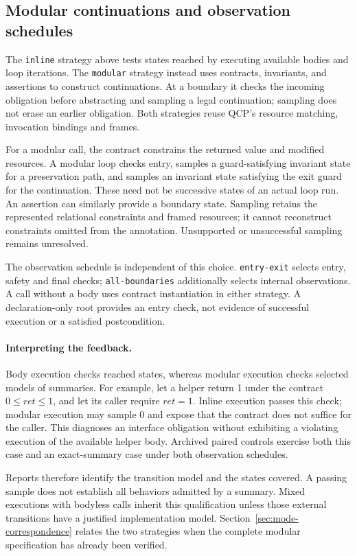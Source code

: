 \subsection{Modular continuations and observation schedules}
\label{sec:strategies}
The \texttt{inline} strategy above tests states reached by executing
available bodies and loop iterations. The \texttt{modular} strategy instead
uses contracts, invariants, and assertions to construct continuations.
At a boundary it checks the incoming obligation before abstracting and
sampling a legal continuation; sampling does not erase an earlier obligation.
Both strategies reuse QCP's resource matching, invocation bindings and frames.

For a modular call, the contract constrains the returned value and modified
resources. A modular loop checks entry, samples a guard-satisfying invariant
state for a preservation path, and samples an invariant state satisfying the
exit guard for the continuation. These need not be successive states of an
actual loop run. An assertion can similarly provide a boundary state.
Sampling retains the represented relational constraints and framed resources;
it cannot reconstruct constraints omitted from the annotation.
Unsupported or unsuccessful sampling remains unresolved.

The observation schedule is independent of this choice.
\texttt{entry-exit} selects entry, safety and final checks;
\texttt{all-boundaries} additionally selects internal observations.
A call without a body uses contract instantiation in either strategy.
A declaration-only root provides an entry check, not evidence of successful
execution or a satisfied postcondition.

\paragraph{Interpreting the feedback.}
Body execution checks reached states, whereas modular execution checks
selected models of summaries. For example, let a helper return 1 under the
contract $0\le\mathit{ret}\le1$, and let its caller require $\mathit{ret}=1$.
Inline execution passes this check; modular execution may sample 0 and
expose that the contract does not suffice for the caller.
This diagnoses an interface obligation without exhibiting a violating
execution of the available helper body. Archived paired controls exercise
both this case and an exact-summary case under both observation schedules.

Reports therefore identify the transition model and the states covered.
A passing sample does not establish all behaviors admitted by a summary.
Mixed executions with bodyless calls inherit this qualification unless
those external transitions have a justified implementation model.
Section~\ref{sec:mode-correspondence} relates the two strategies when the
complete modular specification has already been verified.
